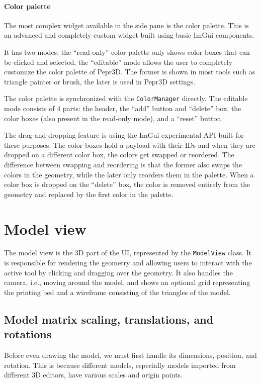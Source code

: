 \paragraph{Color palette}
The most complex widget available in the side pane is the color palette.
This is an advanced and completely custom widget built using basic ImGui components.

It has two modes: the ``read-only'' color palette only shows color boxes that can be clicked and selected, the ``editable'' mode allows the user to completely customize the color palette of Pepr3D.
The former is shown in most tools such as triangle painter or brush, the later is used in Pepr3D settings.

The color palette is synchronized with the \texttt{ColorManager} directly.
The editable mode consists of 4 parts: the header, the ``add'' button and ``delete'' box, the color boxes (also present in the read-only mode), and a ``reset'' button.

The drag-and-dropping feature is using the ImGui experimental API built for these purposes.
The color boxes hold a payload with their IDs and when they are dropped on a different color box, the colors get swapped or reordered.
The difference between swapping and reordering is that the former also swaps the colors in the geometry, while the later only reorders them in the palette.
When a color box is dropped on the ``delete'' box, the color is removed entirely from the geometry and replaced by the first color in the palette.

\section{Model view}

The model view is the 3D part of the UI, represented by the \texttt{ModelView} class.
It is responsible for rendering the geometry and allowing users to interact with the active tool by clicking and dragging over the geometry.
It also handles the camera, i.e., moving around the model, and shows an optional grid representing the printing bed and a wireframe consisting of the triangles of the model.

\subsection{Model matrix scaling, translations, and rotations}
Before even drawing the model, we must first handle its dimensions, position, and rotation.
This is because different models, especially models imported from different 3D editors, have various scales and origin points.

